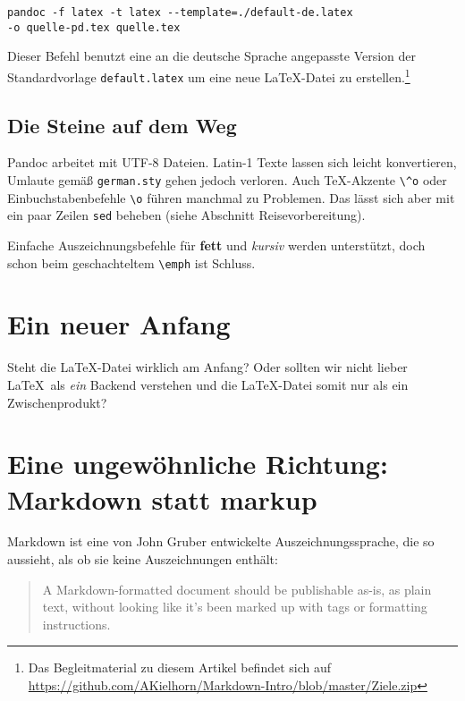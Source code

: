 \documentclass[11pt,ngerman,a4paper]{article}
\begin{document}
\begin{verbatim}
pandoc -f latex -t latex --template=./default-de.latex 
-o quelle-pd.tex quelle.tex
\end{verbatim}

Dieser Befehl benutzt eine an die deutsche Sprache angepasste Version
der Standardvorlage \texttt{default.latex} um eine neue LaTeX-Datei zu
erstellen.\footnote{Das Begleitmaterial zu diesem Artikel befindet sich
  auf
  \url{https://github.com/AKielhorn/Markdown-Intro/blob/master/Ziele.zip}}

\subsection{Die Steine auf dem Weg}\label{die-steine-auf-dem-weg}

Pandoc arbeitet mit UTF-8 Dateien. Latin-1 Texte lassen sich leicht
konvertieren, Umlaute gemäß \texttt{german.sty} gehen jedoch verloren.
Auch TeX-Akzente \texttt{\textbackslash{}\^{}o} oder
Einbuchstabenbefehle \texttt{\textbackslash{}o} führen manchmal zu
Problemen. Das lässt sich aber mit ein paar Zeilen \texttt{sed} beheben
(siehe Abschnitt Reisevorbereitung).

Einfache Auszeichnungsbefehle für \textbf{fett} und \emph{kursiv} werden
unterstützt, doch schon beim geschachteltem
\texttt{\textbackslash{}emph} ist Schluss.

\section{Ein neuer Anfang}\label{ein-neuer-anfang}

Steht die LaTeX-Datei wirklich am Anfang? Oder sollten wir nicht lieber
LaTeX~als \emph{ein} Backend verstehen und die LaTeX-Datei somit nur als
ein Zwischenprodukt?

\section{Eine ungewöhnliche Richtung: Markdown statt
markup}\label{eine-ungewuxf6hnliche-richtung-markdown-statt-markup}

Markdown ist eine von John Gruber\autocite{gruber} entwickelte
Auszeichnungssprache, die so aussieht, als ob sie keine Auszeichnungen
enthält:

\begin{quote}
A Markdown-formatted document should be publishable as-is, as plain
text, without looking like it's been marked up with tags or formatting
instructions.
\end{quote}
\end{document}
